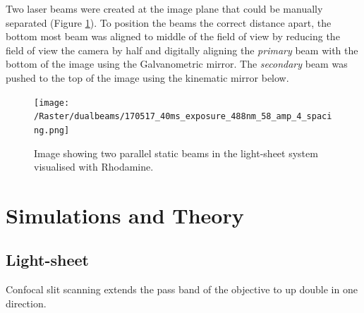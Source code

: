 Two laser beams were created at the image plane that could be manually separated (Figure \ref{fig:real_dual_beams}).
To position the beams the correct distance apart, the bottom most beam was aligned to middle of the field of view by reducing the field of view the camera by half and digitally aligning the \emph{primary} beam with the bottom of the image using the Galvanometric mirror.
The \emph{secondary} beam was pushed to the top of the image using the kinematic mirror below.

\begin{figure}
  \centering
  \texttt{[image: /Raster/dualbeams/170517\_40ms\_exposure\_488nm\_58\_amp\_4\_spacing.png]}
  \caption{Image showing two parallel static beams in the light-sheet system visualised with Rhodamine.}
  \label{fig:real_dual_beams}
\end{figure}

%  
%  

\section{Simulations and Theory}
\subsection{Light-sheet}

Confocal slit scanning extends the pass band of the objective to up double in one direction.

